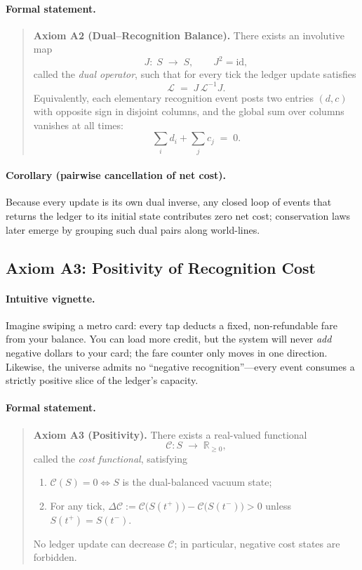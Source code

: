 \documentclass[11pt]{article}
\begin{document}
\paragraph{Formal statement.}
\begin{quote}
\textbf{Axiom A2 (Dual–Recognition Balance).}  
There exists an involutive map
\[
J:\;S \;\longrightarrow\; S,\qquad J^{2}= \mathrm{id},
\]
called the \emph{dual operator}, such that for every tick the ledger update satisfies
\[
\mathcal{L} \;=\; J\,\mathcal{L}^{-1}J.
\]
Equivalently, each elementary recognition event posts two entries \((d,c)\) with opposite sign in disjoint columns, and the global sum over columns vanishes at all times:
\[
\sum_{i} d_{i} + \sum_{j} c_{j} \;=\; 0.
\]
\end{quote}

\paragraph{Corollary (pairwise cancellation of net cost).}
Because every update is its own dual inverse, any closed loop of events that returns the ledger to its initial state contributes zero net cost; conservation laws later emerge by grouping such dual pairs along world-lines.

\subsection{Axiom A3: Positivity of Recognition Cost}
\label{subsec:axiom-a3}

\paragraph{Intuitive vignette.}
Imagine swiping a metro card: every tap deducts a fixed, non-refundable fare from your balance.  You can load more credit, but the system will never \emph{add} negative dollars to your card; the fare counter only moves in one direction.  Likewise, the universe admits no “negative recognition”—every event consumes a strictly positive slice of the ledger’s capacity.

\paragraph{Formal statement.}
\begin{quote}
\textbf{Axiom A3 (Positivity).}  
There exists a real-valued functional  
\[
\mathcal{C}:S \;\longrightarrow\; \mathbb{R}_{\ge 0},
\]
called the \emph{cost functional}, satisfying
\begin{enumerate}
  \item \(\mathcal{C}(S) = 0 \iff S\) is the dual-balanced vacuum state;
  \item For any tick, \(\Delta\mathcal{C} := \mathcal{C}\!\bigl(S(t^{+})\bigr) - \mathcal{C}\!\bigl(S(t^{-})\bigr) > 0\) unless \(S(t^{+}) = S(t^{-})\).
\end{enumerate}
No ledger update can decrease \(\mathcal{C}\); in particular, negative cost states are forbidden.
\end{quote}
\end{document}
